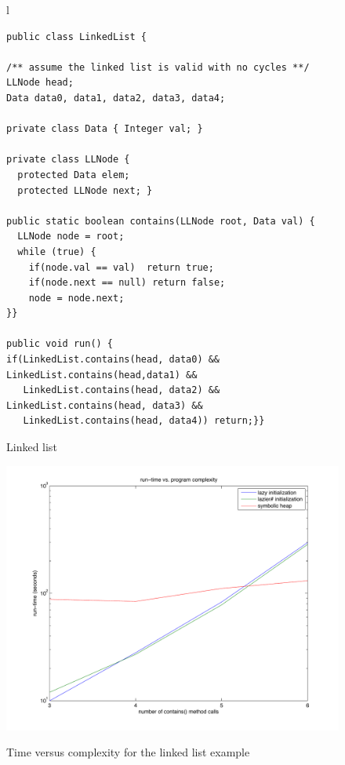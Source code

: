 \begin{figure}
\begin{tabular}[c]{l}
\begin{lstlisting}
public class LinkedList {

/** assume the linked list is valid with no cycles **/
LLNode head;
Data data0, data1, data2, data3, data4;

private class Data { Integer val; }

private class LLNode {
  protected Data elem;
  protected LLNode next; }

public static boolean contains(LLNode root, Data val) {
  LLNode node = root;
  while (true) {
    if(node.val == val)  return true;
    if(node.next == null) return false;
    node = node.next;
}}

public void run() {
if(LinkedList.contains(head, data0) && LinkedList.contains(head,data1) &&
   LinkedList.contains(head, data2) && LinkedList.contains(head, data3) &&
   LinkedList.contains(head, data4)) return;}}
\end{lstlisting}
\end{tabular} 
\caption{Linked list}
\label{fig:example}
\end{figure}

\begin{figure}[htb]
\scalebox{0.45}
{\includegraphics[width=563px]{../figs/time_vs_complexity.pdf}}
\caption{Time versus complexity for the linked list example}
\label{fig:tvc}
\end{figure}

